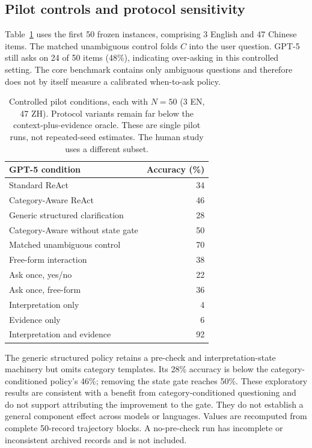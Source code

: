 \subsection{Pilot controls and protocol sensitivity}
Table~\ref{tab:pilot_controls} uses the first 50 frozen instances, comprising 3 English and 47 Chinese items. The matched unambiguous control folds $C$ into the user question. GPT-5 still asks on 24 of 50 items (48\%), indicating over-asking in this controlled setting. The core benchmark contains only ambiguous questions and therefore does not by itself measure a calibrated when-to-ask policy.

\begin{table}[t]
\centering
\small
\begin{tabular}{@{}lr@{}}
\toprule
GPT-5 condition & Accuracy (\%) \\
\midrule
Standard ReAct & 34 \\
Category-Aware ReAct & 46 \\
Generic structured clarification & 28 \\
Category-Aware without state gate & 50 \\
Matched unambiguous control & 70 \\
Free-form interaction & 38 \\
Ask once, yes/no & 22 \\
Ask once, free-form & 36 \\
\midrule
Interpretation only & 4 \\
Evidence only & 6 \\
Interpretation and evidence & 92 \\
\bottomrule
\end{tabular}
\caption{Controlled pilot conditions, each with $N=50$ (3 EN, 47 ZH). Protocol variants remain far below the context-plus-evidence oracle. These are single pilot runs, not repeated-seed estimates. The human study uses a different subset.}
\label{tab:pilot_controls}
\end{table}

The generic structured policy retains a pre-check and interpretation-state machinery but omits category templates. Its 28\% accuracy is below the category-conditioned policy's 46\%; removing the state gate reaches 50\%. These exploratory results are consistent with a benefit from category-conditioned questioning and do not support attributing the improvement to the gate. They do not establish a general component effect across models or languages. Values are recomputed from complete 50-record trajectory blocks. A no-pre-check run has incomplete or inconsistent archived records and is not included.

